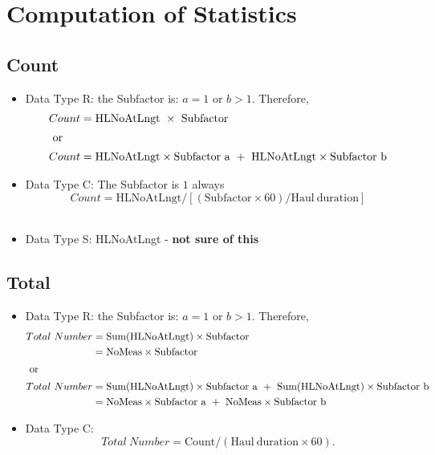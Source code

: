 \documentclass[useAMS,referee]{biom}
\numberwithin{equation}{section}
\begin{document}
\section{Computation of Statistics}

\subsection{Count}
\begin{itemize}
\item { Data Type R}: the Subfactor is: $a =1$ or $b > 1$. Therefore,
\begin{align}
 Count & = \mathrm{HLNoAtLngt \ \times \ Subfactor} \nonumber \\
\intertext{ or}
  Count & = \mathrm{HLNoAtLngt \times Subfactor \ a \ + \ HLNoAtLngt \times Subfactor \ b} \nonumber \\
\end{align}
 \item { Data Type C}: The Subfactor is $1$ always 
  $$ Count = \mathrm{HLNoAtLngt \Big/ \left[(Subfactor \times 60)/ Haul \ duration \right]}$$\\
  \item { Data Type S}:  HLNoAtLngt - {\bf not sure of this }\\
\end{itemize}

\subsection{Total } 
\begin{itemize}
\item { Data Type R}: the Subfactor is: $a =1$ or $b > 1$. Therefore,
\begin{align}
Total \  Number & = \mathrm{Sum(HLNoAtLngt) \times Subfactor} \nonumber \\
& = \mathrm{NoMeas \times Subfactor}  \nonumber  \\
\intertext{ or}
 Total \ Number  & = \mathrm{Sum(HLNoAtLngt) \times Subfactor \ a \ + \ Sum(HLNoAtLngt) \times Subfactor \ b} \nonumber \\
 & = \mathrm{NoMeas \times Subfactor \ a  \ + \ NoMeas \times Subfactor \ b } \nonumber  \\   
\end{align}
\item Data Type C:
$$ Total \ Number =  \mathrm{Count \Big/ (Haul \ duration  \times 60)}. $$ 
\end{itemize}
\end{document}
